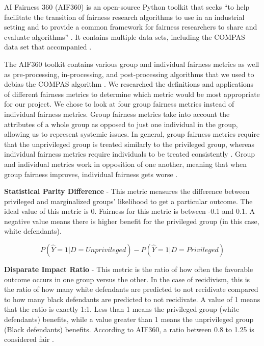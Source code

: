 \documentclass[water,article,submit,moreauthors,pdftex]{mdpi}
\begin{document}
AI Fairness 360 (AIF360) is an open-source Python toolkit that seeks
``to help facilitate the transition of fairness research algorithms to
use in an industrial setting and to provide a common framework for
fairness researchers to share and evaluate algorithms''
\citep{aif360-oct-2018}. It contains multiple data sets, including the
COMPAS data set that accompanied \citet{angwin2016machine}.

The AIF360 toolkit contains various group and individual fairness
metrics as well as pre-processing, in-processing, and post-processing
algorithms that we used to debias the COMPAS algorithm
\citep{aif360-oct-2018}. We researched the definitions and applications
of different fairness metrics \citep{ashokan2021fairness} to determine
which metric would be most appropriate for our project. We chose to look
at four group fairness metrics instead of individual fairness metrics.
Group fairness metrics take into account the attributes of a whole group
as opposed to just one individual in the group, allowing us to represent
systemic issues. In general, group fairness metrics require that the
unprivileged group is treated similarly to the privileged group, whereas
individual fairness metrics require individuals to be treated
consistently \citep{kypraiou_what_2021}. Group and individual metrics
work in opposition of one another, meaning that when group fairness
improves, individual fairness gets worse \citep{kypraiou_what_2021}.

\textbf{Statistical Parity Difference} - This metric measures the
difference between privileged and marginalized groups' likelihood to get
a particular outcome. The ideal value of this metric is 0. Fairness for
this metric is between -0.1 and 0.1. A negative value means there is
higher benefit for the privileged group (in this case, white
defendants).

\[P(\hat{Y}=1|D=Unprivileged) - P(\hat{Y}=1|D=Privileged)\]

\textbf{Disparate Impact Ratio} - This metric is the ratio of how often
the favorable outcome occurs in one group versus the other. In the case
of recidivism, this is the ratio of how many white defendants are
predicted to not recidivate compared to how many black defendants are
predicted to not recidivate. A value of 1 means that the ratio is
exactly 1:1. Less than 1 means the privileged group (white defendants)
benefits, while a value greater than 1 means the unprivileged group
(Black defendants) benefits. According to AIF360, a ratio between 0.8 to
1.25 is considered fair \citep{Ronaghan2019AI}.
\end{document}
